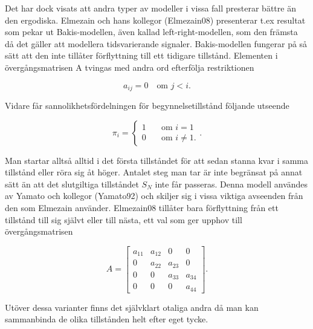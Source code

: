 \documentclass[../rapport_MVEX01-11-05]{subfiles}
\begin{document}
Det har dock visats att andra typer av modeller i vissa fall presterar
bättre än den ergodiska. Elmezain och hans kollegor (Elmezain08)
presenterar t.ex resultat som pekar ut Bakis-modellen, även kallad
left-right-modellen, som den främsta då det gäller att modellera
tidsvarierande signaler. Bakis-modellen fungerar på så sätt att den
inte tillåter förflyttning till ett tidigare tillstånd. Elementen i
övergångsmatrisen A tvingas med andra ord efterfölja restriktionen

\begin{equation*}
a_{ij} = 0 \quad\text{om }j<i.
\end{equation*}

Vidare får sannolikhetsfördelningen för begynnelsetillstånd följande
utseende

\begin{equation*}
\pi_i = \begin{cases}
         1 & \quad\text{om } i = 1\\
         0 & \quad\text{om } i \neq 1.\end{cases}.
\end{equation*}  

Man startar alltså alltid i det första tillståndet för att sedan
stanna kvar i samma tillstånd eller röra sig åt höger. Antalet steg
man tar är inte begränsat på annat sätt än att det slutgiltiga
tillståndet $S_N$ inte får passeras. Denna modell användes av Yamato
och kollegor (Yamato92) och skiljer sig i vissa viktiga avseenden från
den som Elmezain använder. Elmezain08 tillåter bara förflyttning från
ett tillstånd till sig självt eller till nästa, ett val som ger upphov
till övergångsmatrisen

\begin{equation*}
A = \begin{bmatrix}
a_{11} & a_{12} & 0 & 0\\
0 & a_{22} & a_{23} & 0\\
0 & 0 & a_{33} & a_{34}\\
0 & 0 & 0 & a_{44}\end{bmatrix}.  
\end{equation*} 

Utöver dessa varianter finns det självklart otaliga andra då man kan
sammanbinda de olika tillstånden helt efter eget tycke.  
\end{document}
